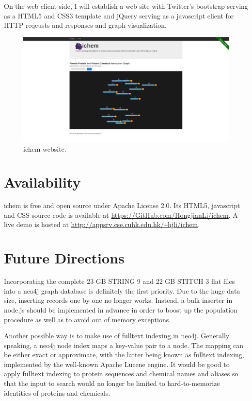 \documentclass[10pt,conference,compsocconf]{../IEEEtran}
\begin{document}
On the web client side, I will establish a web site with Twitter's bootstrap serving as a HTML5 and CSS3 template and jQuery serving as a javascript client for HTTP reqeusts and responses and graph visualization.

\begin{figure}
\centering
\includegraphics[width=\linewidth]{ichem.png}
\caption{ichem website.}
\label{fig:ichem}
\end{figure}

\section{Availability}

ichem is free and open source under Apache License 2.0. Its HTML5, javascript and CSS source code is available at \url{https://GitHub.com/HongjianLi/ichem}. A live demo is hosted at \url{http://appsrv.cse.cuhk.edu.hk/~hjli/ichem}.

\section{Future Directions}

Incorporating the complete 23 GB STRING 9 and 22 GB STITCH 3 flat files into a neo4j graph database is definitely the first priority. Due to the huge data size, inserting records one by one no longer works. Instead, a bulk inserter in node.js should be implemented in advance in order to boost up the population procedure as well as to avoid out of memory exceptions.

Another possible way is to make use of fulltext indexing in neo4j. Generally speaking, a neo4j node index maps a key-value pair to a node. The mapping can be either exact or approximate, with the latter being known as fulltext indexing, implemented by the well-known Apache Lucene engine. It would be good to apply fulltext indexing to protein sequences and chemical names and aliases so that the input to search would no longer be limited to hard-to-memorize identities of proteins and chemicals.
\end{document}
